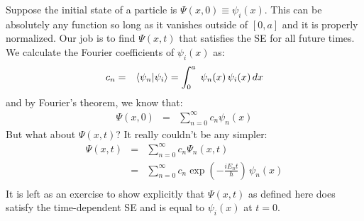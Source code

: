 \documentclass[12pt]{book}
\begin{document}
Suppose the initial state of a particle is $\Psi(x,0) \equiv \psi_i(x)$.  This can be absolutely any function so long as it vanishes outside of $[0,a]$ and it is properly normalized.  Our job is to find $\Psi(x,t)$ that satisfies the SE for all future times.  We calculate the Fourier coefficients of $\psi_i(x)$ as:
\begin{eqnarray*}
c_n &=& \braket{\psi_n| \psi_i} = \int_{0}^{a} \; \psi_n(x) \, \psi_i(x) \, dx \\
\end{eqnarray*}
and by Fourier's theorem, we know that:
\begin{eqnarray*}
\Psi(x,0) &=& \sum_{n=0}^{\infty} c_n \psi_n(x)
\end{eqnarray*}
But what about $\Psi(x,t)$?  It really couldn't be any simpler:
\begin{eqnarray*}
\Psi(x,t) &=& \sum_{n=0}^{\infty} c_n \Psi_n(x,t)\\
          &=& \sum_{n=0}^{\infty} c_n \exp(-\frac{i E_n t}{\hbar}) \, \psi_n(x)\\
\end{eqnarray*}
It is left as an exercise to show explicitly that $\Psi(x,t)$ as defined here does satisfy the time-dependent SE and is equal to $\psi_i(x)$ at $t=0$. 
\end{document}
